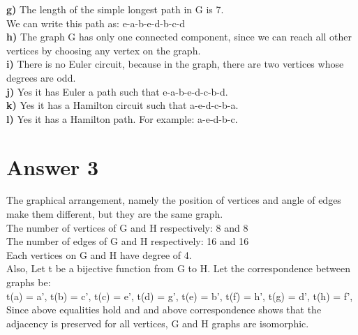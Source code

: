 \documentclass[12pt]{article}
\begin{document}
\textbf{g)} The length of the simple longest path in G is 7.\\
We can write this path as: e-a-b-e-d-b-c-d \\
\textbf{h)} The graph G has only one connected component, since we can reach all other vertices by choosing any vertex on the graph.\\
\textbf{i)} There is no Euler circuit, because in the graph, there are two vertices whose degrees are odd.\\
\textbf{j)} Yes it has Euler a path such that e-a-b-e-d-c-b-d. \\
\textbf{k)} Yes it has a Hamilton circuit such that a-e-d-c-b-a. \\
\textbf{l)} Yes it has a Hamilton path. For example: a-e-d-b-c. \\

\section*{Answer 3}
The graphical arrangement, namely the position of vertices and angle of edges make them different, but they are the same graph. \\
The number of vertices of G and H respectively: 8 and 8 \\
The number of edges of G and H respectively: 16 and 16 \\
Each vertices on G and H have degree of 4. \\
Also, Let t be a bijective function from G to H. Let the correspondence between graphs be: \\
t(a) = a', t(b) = c', t(c) = e', t(d) = g', t(e) = b', t(f) = h',  t(g) = d', t(h) = f', \\

Since above equalities hold and and above correspondence shows that the adjacency is preserved for all vertices, G and H graphs are isomorphic.
\end{document}
